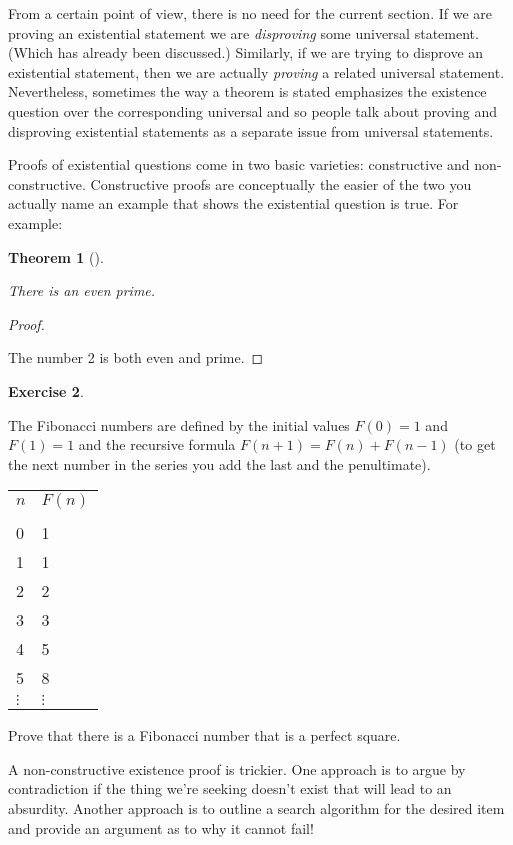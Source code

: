\documentclass[10pt,]{book}
\theoremstyle{plain}
\newtheorem{theorem}{Theorem}[section]
\theoremstyle{definition}
\theoremstyle{definition}
\newtheorem{exercise}[theorem]{Exercise}
\numberwithin{equation}{section}
\newcommand{\hrulethin}  {\noalign{\hrule height 0.04em}}
\begin{document}
    From a certain point of view, there is no need for the current section.
    If we are proving an existential statement we are \emph{disproving} some
    universal statement. (Which has already been discussed.) Similarly,
    if we are trying to disprove an existential statement, then we are
    actually \emph{proving} a related universal statement. Nevertheless,
    sometimes the way a theorem is stated emphasizes the existence question
    over the corresponding universal \textemdash{} and so people talk about proving
    and disproving existential statements as a separate issue from
    universal statements.
\par

    Proofs of existential questions come in two basic varieties: constructive
    and non-constructive. Constructive proofs are conceptually the easier
    of the two \textemdash{} you actually name an example that shows the existential
    question is true. For example:
\begin{theorem}[{}]\label{theorem-11}

        There is an even prime.
\end{theorem}
\begin{proof}\hypertarget{proof-18}{}

      The number 2 is both even and prime.
\end{proof}
\begin{exercise}\label{exercise-26}

        The Fibonacci numbers are defined by the initial values \(F(0)=1\)
        and \(F(1)=1\) and the recursive formula \(F(n+1) = F(n)+F(n-1)\) (to
        get the next number in the series you add the last and the penultimate).
\begin{tabular}{ll}
\(n\)&\(F(n)\)\tabularnewline[0pt]
&\tabularnewline\hrulethin
0&1\tabularnewline[0pt]
1&1\tabularnewline[0pt]
2&2\tabularnewline[0pt]
3&3\tabularnewline[0pt]
4&5\tabularnewline[0pt]
5&8\tabularnewline[0pt]
\(\vdots\)&\(\vdots\)
\end{tabular}
\par

        Prove that there is a Fibonacci number that is a perfect square.
\end{exercise}
\par

    A non-constructive existence proof is trickier. One approach is to argue
    by contradiction \textemdash{} if the thing we're seeking doesn't exist that will
    lead to an absurdity. Another approach is to outline a search algorithm
    for the desired item and provide an argument as to why it cannot fail!
\par
\end{document}
